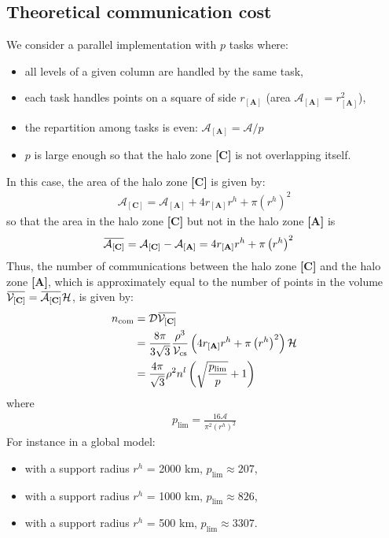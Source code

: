 \documentclass[12pt]{scrartcl}
\newcommand{\overbar}[1]{\mkern 1.5mu\overline{\mkern-1.5mu#1\mkern-1.5mu}\mkern 1.5mu}
\begin{document}
\subsection{Theoretical communication cost}
We consider a parallel implementation with $p$ tasks where:
\begin{itemize}
\item all levels of a given column are handled by the same task,
\item each task handles points on a square of side $r_\mathbf{[A]}$ (area $\mathcal{A}_\mathbf{[A]} = r_\mathbf{[A]}^2$),
\item the repartition among tasks is even: $\mathcal{A}_\mathbf{[A]} = \mathcal{A}/p$
\item $p$ is large enough so that the halo zone \textbf{[C]} is not overlapping itself.
\end{itemize}
In this case, the area of the halo zone \textbf{[C]} is given by:
\begin{align}
\mathcal{A}_\mathbf{[C]} = \mathcal{A}_\mathbf{[A]} + 4 r_\mathbf{[A]} r^h + \pi\left(r^h\right)^2
\end{align}
so that the area in the halo zone \textbf{[C]} but not in the halo zone \textbf{[A]} is
\begin{align}
\overbar{\mathcal{A}_\mathbf{[C]}} & = \mathcal{A}_\mathbf{[C]} - \mathcal{A}_\mathbf{[A]} = 4 r_\mathbf{[A]} r^h + \pi\left(r^h\right)^2
\end{align}
Thus, the number of communications between the halo zone \textbf{[C]} and the halo zone \textbf{[A]}, which is approximately equal to the number of points in the volume $\overbar{\mathcal{V}_\mathbf{[C]}} = \overbar{\mathcal{A}_\mathbf{[C]}} \mathcal{H}$, is given by:
\begin{align}
\label{eq:ncom}
n_\mathrm{com} & = \mathcal{D} \overbar{\mathcal{V}_\mathbf{[C]}} \nonumber \\
& = \frac{8\pi}{3\sqrt{3}} \frac{\rho^3}{\mathcal{V}_\mathrm{cs}} \left(4 r_\mathbf{[A]} r^h + \pi\left(r^h\right)^2\right) \mathcal{H} \nonumber \\
& =  \frac{4\pi}{\sqrt{3}} \rho^2 n^l \left(\sqrt{\frac{p_\mathrm{lim}}{p}} +1 \right)
\end{align}
where
\begin{align}
p_\mathrm{lim} = \frac{16 \mathcal{A}}{\pi^2 \left(r^h\right)^2}
\end{align}
For instance in a global model:
\begin{itemize}
\item with a support radius $r^h$ = 2000 km, $p_\mathrm{lim} \approx 207$,
\item with a support radius $r^h$ = 1000 km, $p_\mathrm{lim} \approx 826$,
\item with a support radius $r^h$ = 500 km, $p_\mathrm{lim} \approx 3307$.
\end{itemize}
\end{document}

